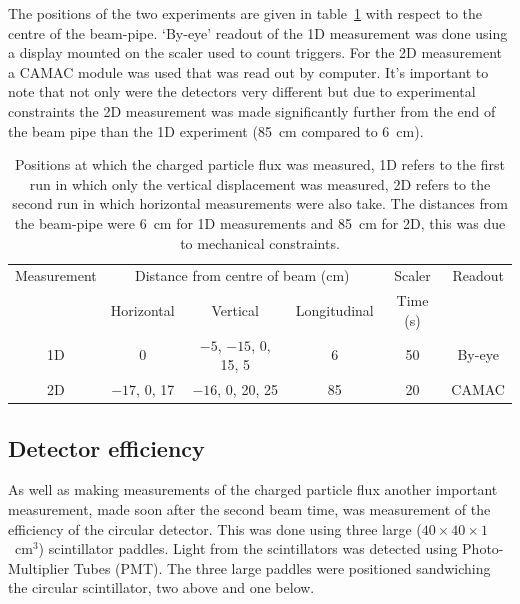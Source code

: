 The positions of the two experiments are given in table~\ref{tab:flux_setup} with respect to the centre of the beam-pipe. `By-eye' readout of the 1D measurement was done using a display mounted on the scaler used to count triggers. For the 2D measurement a CAMAC module was used that was read out by computer. It's important to note that not only were the detectors very different but due to experimental constraints the 2D measurement was made significantly further from the end of the beam pipe than the 1D experiment (85~cm compared to 6~cm).
\begin{table}
  \begin{center}
    \begin{tabular}{c|c|c|c|c|c}
      Measurement  &  \multicolumn{3}{c|}{Distance from centre of beam (cm)}         &  Scaler    &  Readout \\
      &    Horizontal    &       Vertical              &  Longitudinal  &  Time (s)  &          \\
      \hline            
      1D           &  0               &  \(-5\), \(-15\), 0, 15, 5  &       6        &  50        & By-eye   \\
      2D           &  \(-17\), 0, 17  &  \(-16\), 0, 20, 25         &       85       &  20        & CAMAC    \\
    \end{tabular}
  \end{center}
  \caption{Positions at which the charged particle flux was measured, 1D refers to the first run in which only the vertical displacement was measured, 2D refers to the second run in which horizontal measurements were also take. The distances from the beam-pipe were 6~cm for 1D measurements and 85~cm for 2D, this was due to mechanical constraints.}
  \label{tab:flux_setup}
\end{table}

\subsection{Detector efficiency} %
\label{sec:detector_efficiency}
As well as making measurements of the charged particle flux another important measurement, made soon after the second beam time, was measurement of the efficiency of the circular detector. This was done using three large (\( 40\times40\times1 \)~cm\(^3\)) scintillator paddles. Light from the scintillators was detected using Photo-Multiplier Tubes (PMT). The three large paddles were positioned sandwiching the circular scintillator, two above and one below. 

